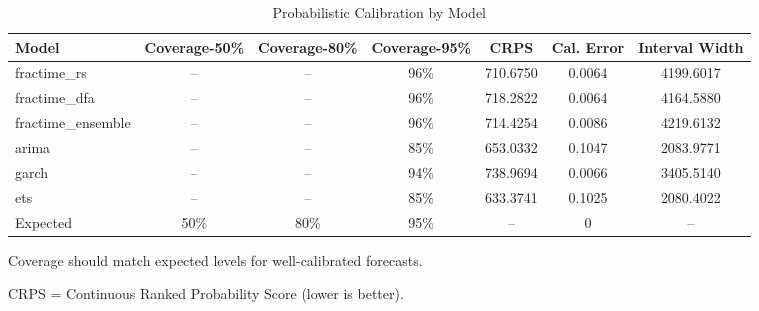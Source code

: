 \begin{table}[htbp]
\centering
\caption{Probabilistic Calibration by Model}
\label{tab:calibration}
\begin{tabular}{lcccccc}
\toprule
Model & Coverage-50\% & Coverage-80\% & Coverage-95\% & CRPS & Cal. Error & Interval Width \\
\midrule
fractime\_rs & -- & -- & 96\% & 710.6750 & 0.0064 & 4199.6017 \\
fractime\_dfa & -- & -- & 96\% & 718.2822 & 0.0064 & 4164.5880 \\
fractime\_ensemble & -- & -- & 96\% & 714.4254 & 0.0086 & 4219.6132 \\
arima & -- & -- & 85\% & 653.0332 & 0.1047 & 2083.9771 \\
garch & -- & -- & 94\% & 738.9694 & 0.0066 & 3405.5140 \\
ets & -- & -- & 85\% & 633.3741 & 0.1025 & 2080.4022 \\
\midrule
Expected & 50\% & 80\% & 95\% & -- & 0 & -- \\
\bottomrule
\end{tabular}
\begin{tablenotes}
\small
\item Coverage should match expected levels for well-calibrated forecasts.
\item CRPS = Continuous Ranked Probability Score (lower is better).
\end{tablenotes}
\end{table}